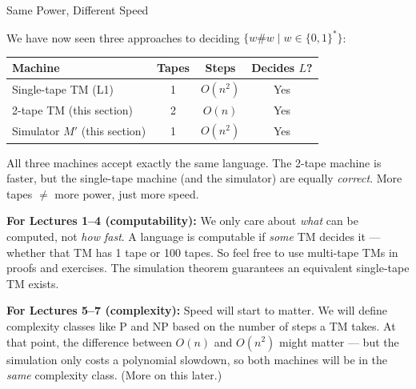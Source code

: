 \begin{conceptbox}{{Same Power, Different Speed}}

We have now seen three approaches to deciding $\{w\#w \mid w \in \{0,1\}^*\}$:

\begin{center}
\begin{tabular}{lccc}
\toprule
\textbf{Machine} & \textbf{Tapes} & \textbf{Steps} & \textbf{Decides $L$?} \\
\midrule
Single-tape TM (L1) & 1 & $O(n^2)$ & Yes \\
2-tape TM (this section) & 2 & $O(n)$ & Yes \\
Simulator $M'$ (this section) & 1 & $O(n^2)$ & Yes \\
\bottomrule
\end{tabular}
\end{center}

All three machines accept exactly the same language. The 2-tape machine is faster, but the single-tape machine (and the simulator) are equally \textit{correct}. More tapes $\neq$ more power, just more speed.

\textbf{For Lectures 1--4 (computability):} We only care about \textit{what} can be computed, not \textit{how fast}. A language is computable if \textit{some} TM decides it --- whether that TM has 1 tape or 100 tapes. So feel free to use multi-tape TMs in proofs and exercises. The simulation theorem guarantees an equivalent single-tape TM exists.

\textbf{For Lectures 5--7 (complexity):} Speed will start to matter. We will define complexity classes like P and NP based on the number of steps a TM takes. At that point, the difference between $O(n)$ and $O(n^2)$ might matter --- but the simulation only costs a polynomial slowdown, so both machines will be in the \textit{same} complexity class. (More on this later.)

\end{conceptbox}

